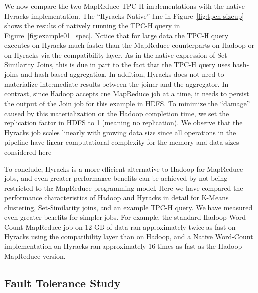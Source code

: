 We now compare the two MapReduce TPC-H implementations with the native Hyracks implementation.
The ``Hyracks Native'' line in Figure~\ref{fig:tpch-sizeup} shows the results of natively running the TPC-H query in Figure~\ref{fig:example01_spec}.
Notice that for large data the TPC-H query executes on Hyracks much faster than the MapReduce counterparts on Hadoop or on Hyracks via the compatibility layer. As in the
native expression of
Set-Similarity Joins, this is due in part to the fact that the TPC-H query uses hash-joins and hash-based aggregation. In addition, Hyracks does not need to materialize
intermediate results between the
joiner and the aggregator. In contrast, since Hadoop accepts one MapReduce job at a time, it needs to persist the output of the Join job for this example in HDFS. To
minimize the ``damage'' caused by this materialization on the Hadoop completion time, we set the replication factor in HDFS to 1 (meaning no replication). We observe that
the Hyracks job scales linearly with growing data size since all operations in the pipeline have linear computational complexity for the memory and data sizes
considered here.

To conclude, Hyracks is a more efficient alternative to Hadoop for MapReduce jobs, and even greater performance benefits can be achieved by not being restricted
to the MapReduce programming model. Here we have compared the performance characteristics of Hadoop and Hyracks in detail for K-Means clustering, Set-Similarity joins, and an
example TPC-H query. We have measured even greater benefits for simpler jobs. For example, the standard Hadoop Word-Count MapReduce job on 12 GB of data ran approximately twice
as fast on Hyracks using the compatibility layer than on Hadoop, and a Native Word-Count implementation on Hyracks ran approximately 16 times as fast as the Hadoop
MapReduce version.

\subsection{Fault Tolerance Study}

